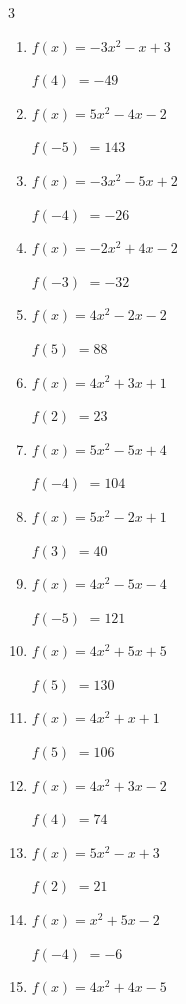 \begin{multicols}{3}
\begin{enumerate}
$f(3)$
        $= 44$

\columnbreak %

  \item $f(x)=-3x^{2}-x+3$

$f(4)$
        $= -49$

  \item $f(x)=5x^{2}-4x-2$

$f(-5)$
        $= 143$

  \item $f(x)=-3x^{2}-5x+2$

$f(-4)$
        $= -26$

  \item $f(x)=-2x^{2}+4x-2$

$f(-3)$
        $= -32$

  \item $f(x)=4x^{2}-2x-2$

$f(5)$
        $= 88$

  \item $f(x)=4x^{2}+3x+1$

$f(2)$
        $= 23$

  \item $f(x)=5x^{2}-5x+4$

$f(-4)$
        $= 104$

  \item $f(x)=5x^{2}-2x+1$

$f(3)$
        $= 40$

  \item $f(x)=4x^{2}-5x-4$

$f(-5)$
        $= 121$

  \item $f(x)=4x^{2}+5x+5$

$f(5)$
        $= 130$

  \item $f(x)=4x^{2}+x+1$

$f(5)$
        $= 106$

  \item $f(x)=4x^{2}+3x-2$

$f(4)$
        $= 74$

  \item $f(x)=5x^{2}-x+3$

$f(2)$
        $= 21$

  \item $f(x)=x^{2}+5x-2$

$f(-4)$
        $= -6$

  \item $f(x)=4x^{2}+4x-5$


\end{enumerate}
\end{multicols}
